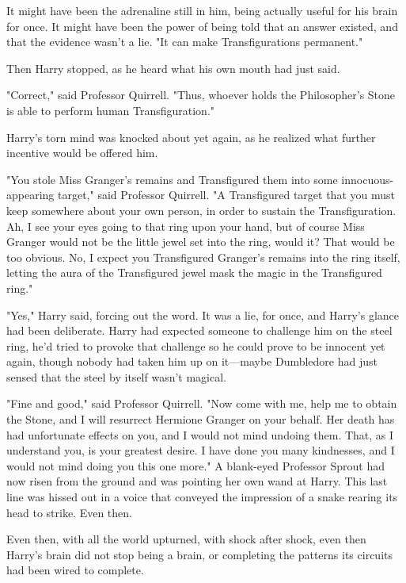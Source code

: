 It might have been the adrenaline still in him, being actually useful for his
brain for once. It might have been the power of being told that an answer
existed, and that the evidence wasn't a lie. "It can make Transfigurations
permanent."

Then Harry stopped, as he heard what his own mouth had just said.

"Correct," said Professor Quirrell. "Thus, whoever holds the Philosopher's
Stone is able to perform human Transfiguration."

Harry's torn mind was knocked about yet again, as he realized what further
incentive would be offered him.

"You stole Miss Granger's remains and Transfigured them into some
innocuous-appearing target," said Professor Quirrell. "A Transfigured target
that you must keep somewhere about your own person, in order to sustain the
Transfiguration. Ah, I see your eyes going to that ring upon your hand, but of
course Miss Granger would not be the little jewel set into the ring, would it?
That would be too obvious. No, I expect you Transfigured Granger's remains into
the ring itself, letting the aura of the Transfigured jewel mask the magic in
the Transfigured ring."

"Yes," Harry said, forcing out the word. It was a lie, for once, and Harry's
glance had been deliberate. Harry had expected someone to challenge him on the
steel ring, he'd tried to provoke that challenge so he could prove to be
innocent yet again, though nobody had taken him up on it---maybe Dumbledore had
just sensed that the steel by itself wasn't magical.

"Fine and good," said Professor Quirrell. "Now come with me, help me to obtain
the Stone, and I will resurrect Hermione Granger on your behalf. Her death has
had unfortunate effects on you, and I would not mind undoing them. That, as I
understand you, is your greatest desire. I have done you many kindnesses, and I
would not mind doing you this one more." A blank-eyed Professor Sprout had now
risen from the ground and was pointing her own wand at Harry.  This last line was hissed out in a voice that conveyed the impression
of a snake rearing its head to strike.
\sbreak
Even then.

Even then, with all the world upturned, with shock after shock, even then
Harry's brain did not stop being a brain, or completing the patterns its
circuits had been wired to complete.

